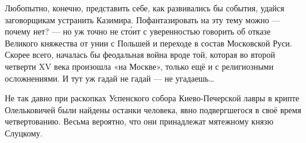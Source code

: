 Любопытно, конечно, представить себе, как развивались бы события, удайся
заговорщикам устранить Казимира. Пофантазировать на эту тему можно — почему
нет? — но уж точно не сто́ит с уверенностью говорить об отказе Великого
княжества от унии с Польшей и переходе в состав Московской Руси. Скорее всего,
началась бы феодальная война вроде той, которая во второй четверти XV века
произошла «на Москве», только ещё и с религиозными осложнениями. И тут уж гадай
не гадай — не угадаешь…

Не так давно при раскопках Успенского собора Киево-Печерской лавры в крипте
Олельковичей были найдены останки человека, явно подвергшегося в своё время
четвертованию. Весьма вероятно, что они принадлежат мятежному князю Слуцкому. 
